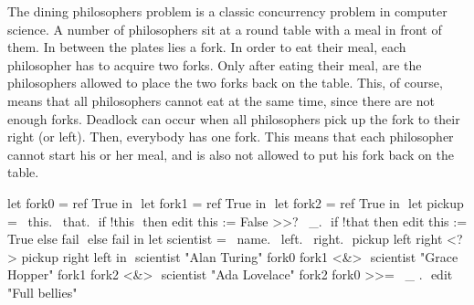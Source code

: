 The dining philosophers problem is a classic concurrency problem in computer science.
A number of philosophers sit at a round table with a meal in front of them.
In between the plates lies a fork.
In order to eat their meal, each philosopher has to acquire two forks.
Only after eating their meal, are the philosophers allowed to place the two forks back on the table.
This, of course, means that all philosophers cannot eat at the same time, since there are not enough forks.
Deadlock can occur when all philosophers pick up the fork to their right (or left).
Then, everybody has one fork.
This means that each philosopher cannot start his or her meal, and is also not allowed to put his fork back on the table.\\

\noindent
\begin{minipage}[r]{0.55\textwidth}

\begin{TASK}[
    numbers=right,
    caption={Dining philosophers problem with three computer scientists.},
    captionpos=b,
    label=lst:dining]
  let fork0 = ref True in $\label{lst:phil:fork0}$
  let fork1 = ref True in $\label{lst:phil:fork1}$
  let fork2 = ref True in $\label{lst:phil:fork2}$
  let pickup = \ this. \ that. $\label{lst:phil:this}$
    if !this $\label{lst:phil:deref}$
      then edit this := False >>? \ _. $\label{lst:phil:mark-used}$
        if !that then edit this := True else fail $\label{lst:phil:that}$
      else fail in
  let scientist = \ name. \ left. \ right. $\label{lst:phil:scientist}$
    pickup left right <?> pickup right left in $\label{lst:phil:pick}$
  scientist "Alan Turing" fork0 fork1 <&> $\label{lst:phil:scientist0}$
  scientist "Grace Hopper" fork1 fork2 <&> $\label{lst:phil:scientist1}$
  scientist "Ada Lovelace" fork2 fork0 >>= \ _ . $\label{lst:phil:scientist2}$
    edit "Full bellies"
\end{TASK}
\end{minipage}
\begin{minipage}[r]{0.05\textwidth}
  \
\end{minipage}
